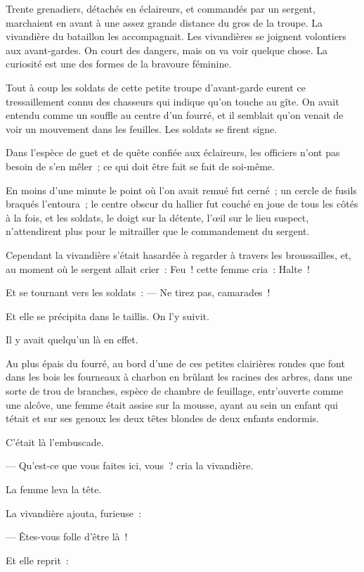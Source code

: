\documentclass[french,twoside]{book} %
\begin{document}
Trente grenadiers, détachés en éclaireurs, et commandés par un sergent, marchaient en avant à une assez grande distance du gros de la troupe. La vivandière du bataillon les accompagnait. Les vivandières se joignent volontiers aux avant-gardes. On court des dangers, mais on va voir quelque chose. La curiosité est une des formes de la bravoure féminine.\par
Tout à coup les soldats de cette petite troupe d’avant-garde eurent ce tressaillement connu des chasseurs qui indique qu’on touche au gîte. On avait entendu comme un souffle au centre d’un fourré, et il semblait qu’on venait de voir un mouvement dans les feuilles. Les soldats se firent signe.\par
Dans l’espèce de guet et de quête confiée aux éclaireurs, les officiers n’ont pas besoin de s’en mêler ; ce qui doit être fait se fait de soi-même.\par
En moins d’une minute le point où l’on avait remué fut cerné ; un cercle de fusils braqués l’entoura ;  le centre obscur du hallier fut couché en joue de tous les côtés à la fois, et les soldats, le doigt sur la détente, l’œil sur le lieu suspect, n’attendirent plus pour le mitrailler que le commandement du sergent.\par
Cependant la vivandière s’était hasardée à regarder à travers les broussailles, et, au moment où le sergent allait crier : Feu ! cette femme cria : Halte !\par
Et se tournant vers les soldats : — Ne tirez pas, camarades !\par
Et elle se précipita dans le taillis. On l’y suivit.\par
Il y avait quelqu’un là en effet.\par
Au plus épais du fourré, au bord d’une de ces petites clairières rondes que font dans les bois les fourneaux à charbon en brûlant les racines des arbres, dans une sorte de trou de branches, espèce de chambre de feuillage, entr’ouverte comme une alcôve, une femme était assise sur la mousse, ayant au sein un enfant qui tétait et sur ses genoux les deux têtes blondes de deux enfants endormis.\par
C’était là l’embuscade.\par
— Qu’est-ce que vous faites ici, vous ? cria la vivandière.\par
La femme leva la tête.\par
La vivandière ajouta, furieuse :\par
— Êtes-vous folle d’être là !\par
Et elle reprit :\par
\end{document}
